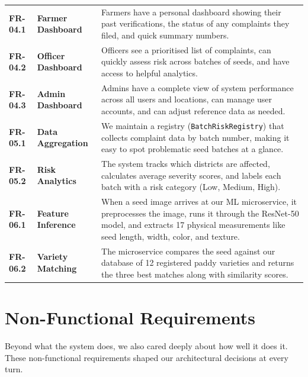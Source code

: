 \begin{longtable}{@{} p{2.0cm} p{3.2cm} >{\raggedright\arraybackslash}p{8.2cm} @{}}
\midrule
\textbf{FR-04.1} & \textbf{Farmer Dashboard} & Farmers have a personal dashboard showing their past verifications, the status of any complaints they filed, and quick summary numbers. \\
\addlinespace
\textbf{FR-04.2} & \textbf{Officer Dashboard} & Officers see a prioritised list of complaints, can quickly assess risk across batches of seeds, and have access to helpful analytics. \\
\addlinespace
\textbf{FR-04.3} & \textbf{Admin Dashboard} & Admins have a complete view of system performance across all users and locations, can manage user accounts, and can adjust reference data as needed. \\
\midrule
\textbf{FR-05.1} & \textbf{Data Aggregation} & We maintain a registry (\texttt{BatchRiskRegistry}) that collects complaint data by batch number, making it easy to spot problematic seed batches at a glance. \\
\addlinespace
\textbf{FR-05.2} & \textbf{Risk Analytics} & The system tracks which districts are affected, calculates average severity scores, and labels each batch with a risk category (Low, Medium, High). \\
\midrule
\textbf{FR-06.1} & \textbf{Feature Inference} & When a seed image arrives at our ML microservice, it preprocesses the image, runs it through the ResNet-50 model, and extracts 17 physical measurements like seed length, width, color, and texture. \\
\addlinespace
\textbf{FR-06.2} & \textbf{Variety Matching} & The microservice compares the seed against our database of 12 registered paddy varieties and returns the three best matches along with similarity scores. \\
\end{longtable}

\section{Non-Functional Requirements}

Beyond what the system does, we also cared deeply about how well it does it.
These non-functional requirements shaped our architectural decisions at every
turn.


